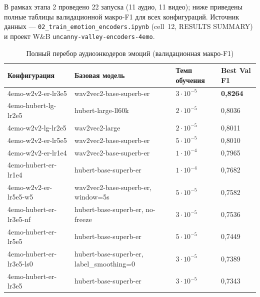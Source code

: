 \documentclass[a4paper, 12pt, oneside, openany]{article}
\begin{document}
В рамках этапа 2 проведено 22 запуска (11 аудио, 11 видео); ниже приведены полные таблицы валидационной макро-F1 для всех конфигураций. Источник данных --- \texttt{02\_train\_emotion\_encoders.ipynb} (cell~12, RESULTS SUMMARY) и проект W\&B \texttt{uncanny-valley-encoders-4emo}.

\begin{table}[H]
\caption{Полный перебор аудиоэнкодеров эмоций (валидационная макро-F1)}
\label{tab:full_audio_sweep}
\centering
\small
\begin{tabular}{|p{6.5cm}|p{1.8cm}|p{1.8cm}|p{1.6cm}|}
\hline
\textbf{Конфигурация} & \textbf{Базовая модель} & \textbf{Темп обучения} & \textbf{Best Val F1} \\
\hline
4emo-w2v2-er-lr3e5 & wav2vec2-base-superb-er & $3\!\cdot\!10^{-5}$ & \textbf{0,8264} \\
\hline
4emo-hubert-lg-lr2e5 & hubert-large-ll60k & $2\!\cdot\!10^{-5}$ & 0,8036 \\
\hline
4emo-w2v2-lg-lr2e5 & wav2vec2-large & $2\!\cdot\!10^{-5}$ & 0,8011 \\
\hline
4emo-w2v2-er-lr5e5 & wav2vec2-base-superb-er & $5\!\cdot\!10^{-5}$ & 0,8010 \\
\hline
4emo-w2v2-er-lr1e4 & wav2vec2-base-superb-er & $1\!\cdot\!10^{-4}$ & 0,7965 \\
\hline
4emo-hubert-er-lr1e4 & hubert-base-superb-er & $1\!\cdot\!10^{-4}$ & 0,7682 \\
\hline
4emo-w2v2-er-lr5e5-w5 & wav2vec2-base-superb-er, window=5s & $5\!\cdot\!10^{-5}$ & 0,7582 \\
\hline
4emo-hubert-er-lr3e5-nf & hubert-base-superb-er, no-freeze & $3\!\cdot\!10^{-5}$ & 0,7536 \\
\hline
4emo-hubert-er-lr5e5 & hubert-base-superb-er & $5\!\cdot\!10^{-5}$ & 0,7449 \\
\hline
4emo-hubert-er-lr3e5-ls0 & hubert-base-superb-er, label\_smoothing=0 & $3\!\cdot\!10^{-5}$ & 0,7389 \\
\hline
4emo-hubert-er-lr3e5 & hubert-base-superb-er & $3\!\cdot\!10^{-5}$ & 0,7343 \\
\hline
\end{tabular}
\end{table}
\end{document}
